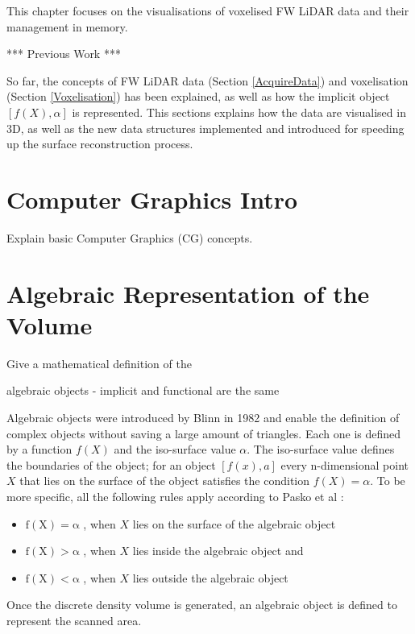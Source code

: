 \documentclass{subfiles}
\begin{document}
	

\par This chapter focuses on the visualisations of voxelised FW LiDAR data and their management in memory.

*** Previous Work *** 

\par So far, the concepts of FW LiDAR data (Section \ref{AcquireData}) and voxelisation (Section \ref{Voxelisation}) has been explained, as well as how the implicit object $[f(X),\alpha]$ is represented. This sections explains how the data are visualised in 3D, as well as the new data structures implemented and introduced for speeding up the surface reconstruction process. 


\section{Computer Graphics Intro}
Explain basic Computer Graphics (CG) concepts. 

\section{Algebraic Representation of the Volume}

Give a mathematical definition of the 

algebraic objects - implicit and functional are the same 

\par Algebraic objects were introduced by Blinn in 1982 \cite{Blinn1982} and enable the definition of complex objects without saving a large amount of triangles. Each one is defined by a function $ \mathit{f(X)} $ and the iso-surface value $\alpha$. The iso-surface value defines the boundaries of the object; for an object $ [f(x),a]$ every n-dimensional point $ \mathit{X} $  that lies on the surface of the object satisfies the condition $ \mathit{f(X)=\alpha }  $. To be more specific, all the following rules apply according to Pasko et al \cite{Pasko1994}: 
\begin{itemize}
	\item $	\mathrm{f(X) = \alpha }$ , when $X$ lies on the surface of the algebraic object
	\item $	\mathrm{f(X) > \alpha }$ , when $X$ lies inside the algebraic object and
	\item $	\mathrm{f(X) < \alpha }$ , when $X$ lies outside the algebraic object	 
\end{itemize}

\par Once the discrete density volume is generated, an algebraic object is defined to represent the scanned area. 
\end{document}
